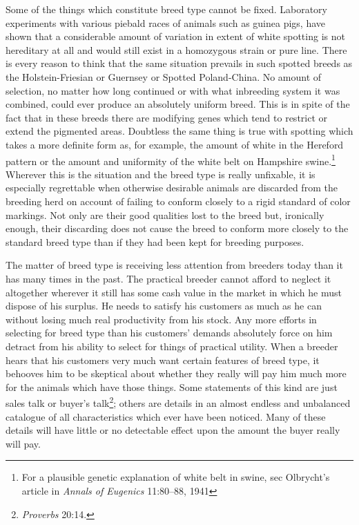 Some of the things which constitute breed type cannot be fixed.
Laboratory experiments with various piebald races of animals such as
guinea pigs, have shown that a considerable amount of variation in
extent of white spotting is not hereditary at all and would still exist in
a homozygous strain or pure line. There is every reason to think that
the same situation prevails in such spotted breeds as the Holstein-Friesian
or Guernsey or Spotted Poland-China. No amount of selection, no
matter how long continued or with what inbreeding system it was combined,
could ever produce an absolutely uniform breed. This is in
spite of the fact that in these breeds there are modifying genes which
tend to restrict or extend the pigmented areas. Doubtless the same thing
is true with spotting which takes a more definite form as, for example,
the amount of white in the Hereford pattern or the amount and uniformity
of the white belt on Hampshire swine.\footnote{For a plausible genetic
explanation of white belt in swine, sec Olbrycht's article
in \textit{Annals of Eugenics} 11:80--88, 1941} Wherever this is the
situation and the breed type is really unfixable, it is especially regrettable
when otherwise desirable animals are discarded from the breeding
herd on account of failing to conform closely to a rigid standard of
color markings. Not only are their good qualities lost to the breed but,
ironically enough, their discarding does not cause the breed to conform
more closely to the standard breed type than if they had been kept for
breeding purposes.

The matter of breed type is receiving less attention from breeders
today than it has many times in the past. The practical breeder cannot
afford to neglect it altogether wherever it still has some cash value in
the market in which he must dispose of his surplus. He needs to satisfy
his customers as much as he can without losing much real productivity
from his stock. Any more efforts in selecting for breed type than his
customers' demands absolutely force on him detract from his ability to
select for things of practical utility. When a breeder hears that his customers
very much want certain features of breed type, it behooves him
to be skeptical about whether they really will pay him much more for
the animals which have those things. Some statements of this kind are
just sales talk or buyer's talk\footnote{\textit{Proverbs} 20:14.};
others are details in an almost endless and unbalanced catalogue of
all characteristics which ever have been noticed. Many of these details
will have little or no detectable effect upon the amount the buyer really
will pay.
\nowidow
{}

